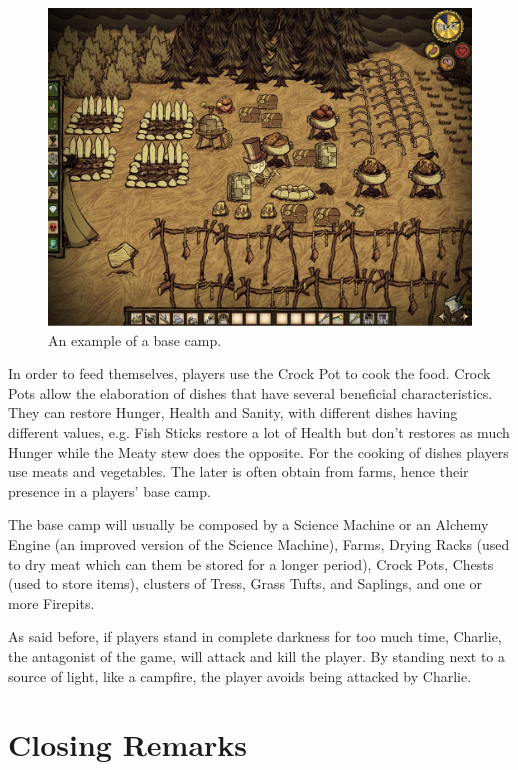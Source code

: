 \begin{figure}
  \centering
  \includegraphics[width=\textwidth]{./Images/basecamp-example}
  \caption{An example of a base camp.}
  \label{fig:basecamp-example}
\end{figure}

In order to feed themselves, players use the Crock Pot to cook the food.
Crock Pots allow the elaboration of dishes that have several beneficial characteristics.
They can restore Hunger, Health and Sanity, with different dishes having different values, e.g. Fish Sticks restore a lot of Health but don't restores as much Hunger while the Meaty stew does the opposite.
For the cooking of dishes players use meats and vegetables.
The later is often obtain from farms, hence their presence in a players' base camp.

The base camp will usually be composed by a Science Machine or an Alchemy Engine (an improved version of the Science Machine), Farms, Drying Racks (used to dry meat which can them be stored for a longer period), Crock Pots, Chests (used to store items), clusters of Tress, Grass Tufts, and Saplings, and one or more Firepits.

As said before, if players stand in complete darkness for too much time, Charlie, the antagonist of the game, will attack and kill the player.
By standing next to a source of light, like a campfire, the player avoids being attacked by Charlie.

\section{Closing Remarks}

